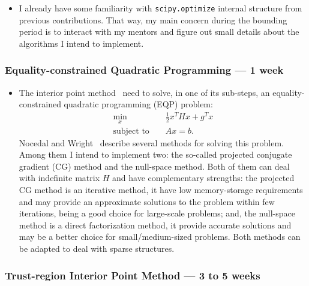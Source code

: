\documentclass[11pt]{article}
\begin{document}
\begin{itemize}
\item
  I already have some familiarity with \texttt{scipy.optimize} internal structure
  from previous contributions. That way, my main concern during the bounding period is
  to interact with my mentors and figure out small details about the algorithms
  I intend to implement.
\end{itemize}


\subsubsection*{Equality-constrained Quadratic Programming --- 1  week}
\begin{itemize}
\item
  The interior point method~\cite{byrd1999interior} need to solve, in one of its sub-steps,
  an equality-constrained quadratic programming (EQP) problem:
  \begin{eqnarray}
    \label{eq:eqp}
    \min_x && \tfrac{1}{2}x^THx+g^Tx\\\nonumber
    \text{subject to } &&  A x = b.
  \end{eqnarray}
  Nocedal and Wright~\cite[Sec. 16.1 to 16.3]{nocedal2006numerical} describe
  several  methods for solving this problem.
  Among them I intend to implement two: the so-called projected conjugate
  gradient (CG) method  and the null-space method. Both of them can deal with indefinite
  matrix $H$ and have complementary strengths: the projected CG method is an iterative
  method, it have low memory-storage requirements and may provide an approximate
  solutions to the problem within few iterations, being a good choice
  for large-scale problems; and, the null-space method is a direct factorization method,
  it provide accurate solutions and may be a better choice for small/medium-sized
  problems. Both methods can be adapted to deal with sparse structures.
\end{itemize}


\subsubsection*{Trust-region Interior Point Method --- 3 to 5 weeks}
\end{document}
